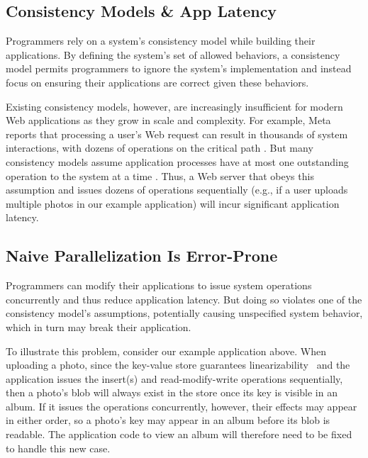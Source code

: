 \subsection{Consistency Models \& App Latency}

Programmers rely on a system's consistency model while building their applications. By defining the system's set of allowed behaviors, a consistency model permits programmers to ignore the system's implementation and instead focus on ensuring their applications are correct given these behaviors.


Existing consistency models, however, are increasingly insufficient for modern Web applications as they grow in scale and complexity. For example, Meta reports that processing a user's Web request can result in thousands of system interactions, with dozens of operations on the critical path \cite{ajoux2015challenges}. But many consistency models assume application processes have at most one outstanding operation to the system at a time \cite{ahamad1995causal,herlihy1990linearizability}. Thus, a Web server that obeys this assumption and issues dozens of operations sequentially
(e.g., if a user uploads multiple photos in our example application)
will incur significant application latency.


\subsection{Naive Parallelization Is Error-Prone}

Programmers can modify their applications to issue system operations concurrently
and thus reduce application latency. But doing so violates one of the consistency
model's assumptions, potentially causing unspecified system behavior,
which in turn may break their application.

To illustrate this problem, consider our example application above.
When uploading a photo, since the key-value store guarantees
linearizability~\cite{herlihy1990linearizability} and the application issues the
insert(s) and read-modify-write operations sequentially, then a photo's blob will
always exist in the store once its key is visible in an album.
If it issues the operations concurrently, however, their effects may appear in either order,
so a photo's key may appear in an album before its blob is readable.
The application code to view an album will therefore need to be fixed to handle this new case.

